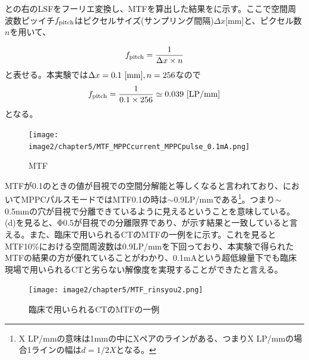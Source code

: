 との右のLSFをフーリエ変換し、MTFを算出した結果をに示す。ここで空間周波数ピッイチ$f_{\rm pitch}$はピクセルサイズ(サンプリング間隔)$\Delta x$[mm]と、ピクセル数$n$を用いて、

\begin{align}
f_{\rm pitch} = \frac{1}{\Delta x\times n}
\end{align}
と表せる。本実験では$\Delta x = 0.1\ {\rm [mm]}, n=256$なので
\begin{align}
f_{\rm pitch} = \frac{1}{0.1\times256}\simeq0.039\ {\rm[LP/mm]}
\end{align}
となる。



\begin{figure}[H]
 \begin{center}
 \texttt{[image: image2/chapter5/MTF\_MPPCcurrent\_MPPCpulse\_0.1mA.png]} 
 \end{center}
 \caption{MTF}
 \label{fig:MTF_matome}
\end{figure}

MTFが0.1のときの値が目視での空間分解能と等しくなると言われており、においてMPPCパルスモードではMTF0.1の時は$\sim$0.9LP/mmである\footnote{X LP/mmの意味は1mmの中にXペアのラインがある、つまりX LP/mmの場合1ラインの幅は$d=1/2X$となる。}。つまり$\sim$0.5mmの穴が目視で分離できているように見えるということを意味している。(d)を見ると、Φ0.5が目視での分離限界であり、が示す結果と一致していると言える。また、臨床で用いられるCTのMTFの一例をに示す。これを見るとMTF10\%における空間周波数は0.9LP/mmを下回っており、本実験で得られたMTFの結果の方が優れていることがわかり、0.1mAという超低線量下でも臨床現場で用いられるCTと劣らない解像度を実現することができたと言える。

\begin{figure}[H]
 \begin{center}
 \texttt{[image: image2/chapter5/MTF\_rinsyou2.png]} 
 \end{center}
 \caption{臨床で用いられるCTのMTFの一例}
 \label{fig:MTF_rinshou}
\end{figure}